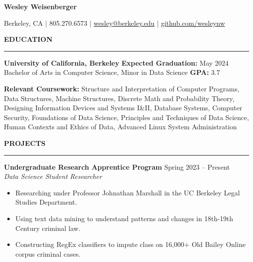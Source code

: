 \documentclass{article}
\begin{document}
    \newcommand{\header}[1]{ 
        \vspace{5mm}
        {\large \noindent \textbf{#1}}
        \vspace{1.5mm}
        \hrule
        \vspace{3.5mm}
    }




    {\huge \textbf{Wesley Weisenberger}}
    
    \vspace{1.5mm}

    {\Large Berkeley, CA  $\mid$ 805.270.6573 $\mid$ 
    \href{mailto:wesley@berkeley.edu}{wesley@berkeley.edu}
    $\mid$ 
    \href{https://github.com/wesleynw}{github.com/wesleynw}}
        

    \header{EDUCATION}

        \textbf{University of California, Berkeley} 
        \hfill 
        \textbf{Expected Graduation:} May 2024 \\
        Bachelor of Arts in Computer Science, Minor in Data Science \hfill \textbf{GPA:} 3.7

    \vspace{2.5mm}

    \textbf{Relevant Coursework:}
        Structure and Interpretation of Computer Programs, 
        Data Structures,
        Machine Structures,
        Discrete Math and Probability Theory, 
        Designing Information Devices and Systems I\&II,
        Database Systems,
        Computer Security,
        Foundations of Data Science,
        Principles and Techniques of Data Science, \\
        Human Contexts and Ethics of Data,
        Advanced Linux System Administration
        
    \vspace{-2mm}

    \header{PROJECTS}

    \noindent \textbf{Undergraduate Research Apprentice Program} \hfill Spring 2023 -- Present
    \\ \textit{Data Science Student Researcher}
    \begin{itemize}
        \item Researching under Professor Johnathan Marshall in the UC Berkeley Legal Studies Department.
        \item Using text data mining to understand patterns and changes in 18th-19th Century criminal law.
        \item Constructing RegEx classifiers to impute class on 16,000+ Old Bailey Online corpus criminal cases.
    \end{itemize}
\end{document}
